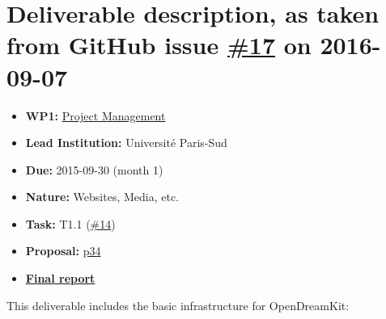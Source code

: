 \section*{\texorpdfstring{Deliverable description, as taken from GitHub
issue
\href{https://github.com/OpenDreamKit/OpenDreamKit/issues/17}{\#17} on
2016-09-07}{Deliverable description, as taken from GitHub issue \#17 on 2016-09-07}}\label{deliverable-description-as-taken-from-github-issues-17-on-2016-09-07}

\begin{itemize}
\tightlist
\item
  \textbf{WP1:}
  \href{https://github.com/OpenDreamKit/OpenDreamKit/tree/master/WP1}{Project
  Management}
\item
  \textbf{Lead Institution:} Université Paris-Sud
\item
  \textbf{Due:} 2015-09-30 (month 1)
\item
  \textbf{Nature:} Websites, Media, etc.
\item
  \textbf{Task:} T1.1
  (\href{https://github.com/OpenDreamKit/OpenDreamKit/issues/14}{\#14})
\item
  \textbf{Proposal:}
  \href{https://github.com/OpenDreamKit/OpenDreamKit/raw/master/Proposal/proposal-www.pdf}{p34}
\item
  \textbf{\href{https://github.com/OpenDreamKit/OpenDreamKit/raw/master/WP1/D1.1/report-final.pdf}{Final
  report}}
\end{itemize}

This deliverable includes the basic infrastructure for OpenDreamKit:

